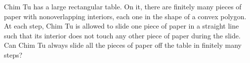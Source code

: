 Chim Tu has a large rectangular table. On it, there are ﬁnitely many pieces of paper with nonoverlapping interiors, each one in the shape of a convex polygon. At each step, Chim Tu is allowed to slide one piece of paper in a straight line such that its interior does not touch any other piece of paper during the slide. Can Chim Tu always slide all the pieces of paper off the table in ﬁnitely many steps?
